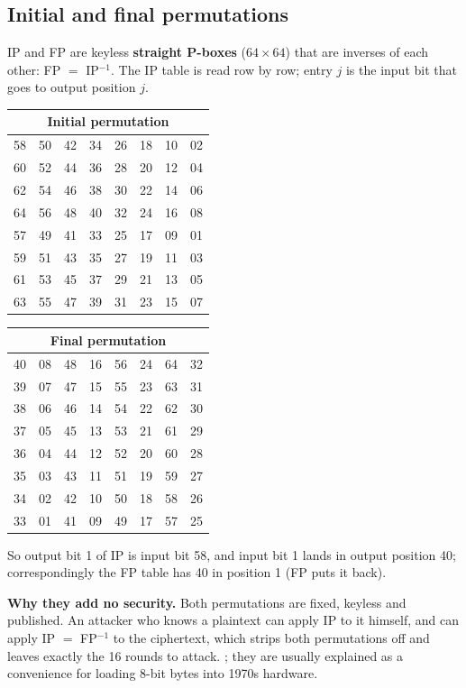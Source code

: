 \subsection{Initial and final permutations}
IP and FP are keyless \textbf{straight P-boxes} ($64 \times 64$) that are inverses of each other: FP $=$ IP$^{-1}$. The IP table is read row by row; entry $j$ is the input bit that goes to output position $j$.
\begin{center}\scriptsize\setlength{\tabcolsep}{3.2pt}
\begin{tabular}{@{}*{8}{c}@{}}
\multicolumn{8}{c}{\textbf{Initial permutation}}\\ \midrule
58&50&42&34&26&18&10&02\\ 60&52&44&36&28&20&12&04\\ 62&54&46&38&30&22&14&06\\ 64&56&48&40&32&24&16&08\\
57&49&41&33&25&17&09&01\\ 59&51&43&35&27&19&11&03\\ 61&53&45&37&29&21&13&05\\ 63&55&47&39&31&23&15&07\\
\end{tabular}
\qquad
\begin{tabular}{@{}*{8}{c}@{}}
\multicolumn{8}{c}{\textbf{Final permutation}}\\ \midrule
40&08&48&16&56&24&64&32\\ 39&07&47&15&55&23&63&31\\ 38&06&46&14&54&22&62&30\\ 37&05&45&13&53&21&61&29\\
36&04&44&12&52&20&60&28\\ 35&03&43&11&51&19&59&27\\ 34&02&42&10&50&18&58&26\\ 33&01&41&09&49&17&57&25\\
\end{tabular}
\end{center}
So output bit 1 of IP is input bit 58, and input bit 1 lands in output position 40; correspondingly the FP table has 40 in position 1 (FP puts it back).

\textbf{Why they add no security.} Both permutations are fixed, keyless and published. An attacker who knows a plaintext can apply IP to it himself, and can apply IP $=$ FP$^{-1}$ to the ciphertext, which strips both permutations off and leaves exactly the 16 rounds to attack. ; they are usually explained as a convenience for loading 8-bit bytes into 1970s hardware.

